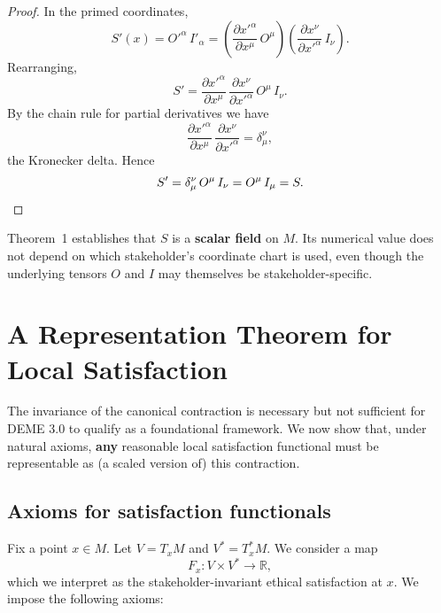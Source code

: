 \documentclass[12pt]{article}
\theoremstyle{remark}
\begin{document}
\begin{proof}
In the primed coordinates,
\begin{equation}
    S'(x) = O'^{\alpha}\, I'_{\alpha}
    = \left(\frac{\partial x'^{\alpha}}{\partial x^{\mu}}\, O^{\mu}\right)
      \left(\frac{\partial x^{\nu}}{\partial x'^{\alpha}}\, I_{\nu}\right).
\end{equation}
Rearranging,
\begin{equation}
    S' = \frac{\partial x'^{\alpha}}{\partial x^{\mu}}\,
         \frac{\partial x^{\nu}}{\partial x'^{\alpha}}\,
         O^{\mu}\, I_{\nu}.
\end{equation}
By the chain rule for partial derivatives we have
\begin{equation}
    \frac{\partial x'^{\alpha}}{\partial x^{\mu}}\,
    \frac{\partial x^{\nu}}{\partial x'^{\alpha}} = \delta^{\nu}_{\mu},
\end{equation}
the Kronecker delta. Hence
\begin{equation}
    S' = \delta^{\nu}_{\mu}\, O^{\mu}\, I_{\nu} = O^{\mu}\, I_{\mu} = S.
    \qedhere
\end{equation}
\end{proof}

Theorem~1 establishes that $S$ is a \textbf{scalar field} on $M$. Its numerical value does not depend on which stakeholder's coordinate chart is used, even though the underlying tensors $O$ and $I$ may themselves be stakeholder-specific.

\section{A Representation Theorem for Local Satisfaction}

The invariance of the canonical contraction is necessary but not sufficient for DEME 3.0 to qualify as a foundational framework. We now show that, under natural axioms, \textbf{any} reasonable local satisfaction functional must be representable as (a scaled version of) this contraction.

\subsection{Axioms for satisfaction functionals}

Fix a point $x \in M$. Let $V = T_x M$ and $V^* = T_x^* M$. We consider a map
\begin{equation}
    F_x\colon V \times V^* \to \mathbb{R},
\end{equation}
which we interpret as the stakeholder-invariant ethical satisfaction at $x$. We impose the following axioms:
\end{document}
